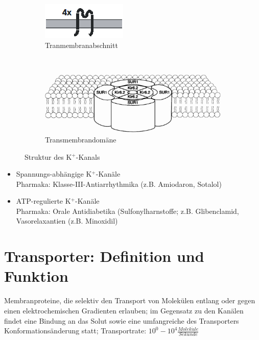 \documentclass[10pt,a4paper]{report}
\begin{document}
\begin{figure}[h]
    \centering
    \begin{subfigure}[b]{0.3\textwidth}
        \includegraphics[width=\textwidth]{Bilder/transmembrank.png}
        \caption{Tranmembranabschnitt}
        \label{fig:transmembranna}
    \end{subfigure}
    ~ %
    \begin{subfigure}[b]{0.3\textwidth}
        \includegraphics[width=\textwidth]{Bilder/aufbauk.png}
        \caption{Transmembrandomäne}
        \label{fig:transmebrandomaene}
    \end{subfigure}
    \caption{Struktur des K$^+$-Kanals}
    \label{fig:struktur_k_kanal}
\end{figure}

\begin{itemize}
	\item Spannungs-abhängige K$^+$-Kanäle \\
	Pharmaka: Klasse-III-Antiarrhythmika (z.B. Amiodaron, Sotalol)
	\item ATP-regulierte  K$^+$-Kanäle \\
	Pharmaka: Orale Antidiabetika (Sulfonylharnstoffe; z.B. Glibenclamid, Vasorelaxantien (z.B. Minoxidil)
\end{itemize}

\section{Transporter: Definition und Funktion}
Membranproteine, die selektiv den Transport von Molekülen entlang oder gegen einen elektrochemischen Gradienten erlauben; im Gegensatz zu den Kanälen findet eine Bindung an das Solut sowie eine umfangreiche  des Transporters Konformationsänderung statt; Transportrate: $10^0-10^4 \frac{Molek\ddot{u}le}{Sekunde}$
\end{document}
